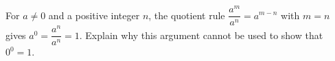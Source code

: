 For $a\ne0$ and a positive integer $n$, the quotient rule $\dfrac{a^m}{a^n}=a^{m-n}$ with $m=n$ gives $a^0=\dfrac{a^n}{a^n}=1$. Explain why this argument cannot be used to show that $0^0=1$.
